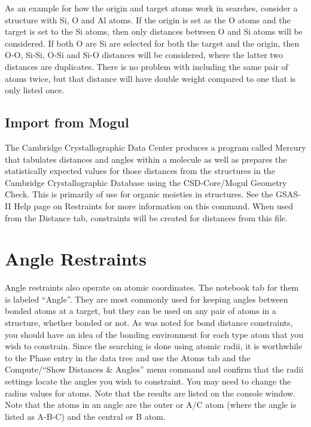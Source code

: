 As an example for how the origin and target atoms work in searches, consider a structure with Si, O and Al atoms. If the origin is set as the O atoms and the target is set to the Si atoms, then only distances between O and Si atoms will be considered. If both O are Si are selected for both the target and the origin, then O-O, Si-Si, O-Si and Si-O distances will be considered, where the latter two distances are duplicates. There is no problem with including the same pair of atoms twice, but that distance will have double weight compared to one that is only listed once. 

\subsection{Import from Mogul}
The Cambridge Crystallographic Data Center produces a program called Mercury that tabulates distances and angles within a molecule as well as prepares the statistically expected values for those distances from the structures in the Cambridge Crystallographic Database using the CSD-Core/Mogul Geometry Check. This is primarily of use for organic moieties in structures. See the GSAS-II Help page on Restraints for more information on this command. When used from the Distance tab, constraints will be created for  distances from this file. 

\section{Angle Restraints}
Angle restraints also operate on atomic coordinates. The notebook tab for them is labeled ``Angle''. 
They are most commonly used for keeping angles between bonded atoms at a target, but they can be used on any pair of atoms in a structure, whether bonded or not. As was noted for bond distance constraints, you should have an idea of the bonding environment for each type atom that you wish to constrain. Since the searching is done using atomic radii, it is worthwhile to the Phase entry in the data tree and use the Atoms tab and the Compute/``Show Distances \& Angles'' menu command and confirm that the radii settings locate the angles you wish to constraint. You may need to change the radius values for atoms. Note that the results are listed on the console window. Note that the atoms in an angle are the outer or A/C atom (where the angle is listed as A-B-C) and the central or B atom. 

